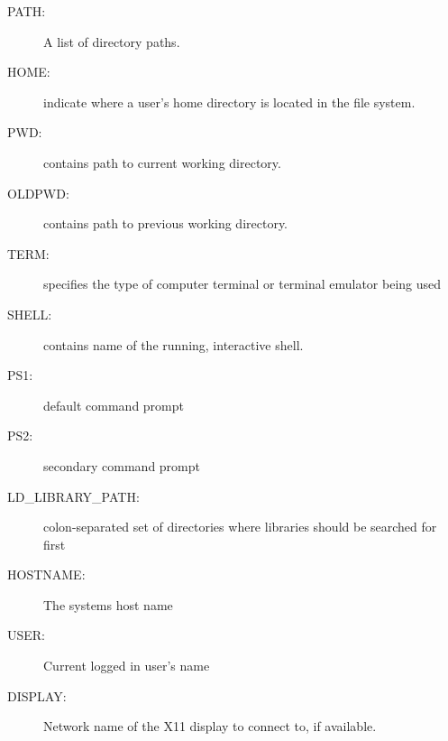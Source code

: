 \documentclass[c,compress,xcolor=svgnames]{beamer}
\newcommand{\Verbpurple}[1]{\Verb[formatcom=\color{tigerspurple},fontseries=b]|#1|}
\newcommand{\Verbgreen}[1]{\Verb[formatcom=\color{dkgreen},fontseries=b,commandchars=\\\{\}]|#1|}
\begin{document}
\begin{frame}
\begin{itemize}
  \end{itemize}
  \framebreak
  \begin{description}
    \item[PATH:] A list of directory paths.
    \item[HOME:] indicate where a user's home directory is located in the file system.
    \item[PWD:] contains path to current working directory.
    \item[OLDPWD:] contains path to previous working directory.
    \item[TERM:] specifies the type of computer terminal or terminal emulator being used
    \item[SHELL:] contains name of the running, interactive shell.
    \item[PS1:] default command prompt
    \item[PS2:] secondary command prompt
    \item[LD\_LIBRARY\_PATH:] colon-separated set of directories where libraries should be searched for first
    \item[HOSTNAME:] The systems host name
    \item[USER:] Current logged in user's name
    \item[DISPLAY:] Network name of the X11 display to connect to, if available.
  \end{description}
  \framebreak
\end{frame}
\end{document}
